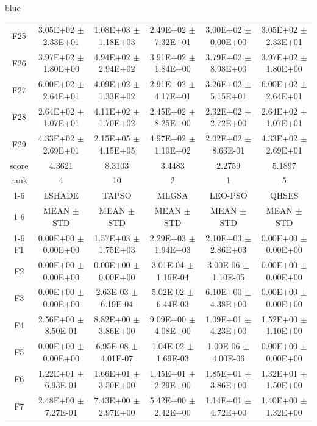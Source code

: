 \documentclass[journal, onecolumn]{IEEEtran}
\begin{document}
\begin{color}{blue}
\begin{table}[htbp!]
\begin{tabular}{c|ccccc}
			F25	 &	3.05E+02	$\pm$	2.33E+01	 &	1.08E+03	$\pm$	1.18E+03		 &	2.49E+02	$\pm$	7.32E+01		 &	3.00E+02	$\pm$	0.00E+00		 &	3.05E+02	$\pm$	2.33E+01	\\		
			F26	 &	3.97E+02	$\pm$	1.80E+00	 &	4.94E+02	$\pm$	2.94E+02		 &	3.91E+02	$\pm$	1.84E+00		 &	3.79E+02	$\pm$	8.98E+00		 &	3.97E+02	$\pm$	1.80E+00	\\		
			F27	 &	6.00E+02	$\pm$	2.64E+01	 &	4.09E+02	$\pm$	1.33E+02		 &	2.91E+02	$\pm$	4.17E+01		 &	3.26E+02	$\pm$	5.15E+01		 &	6.00E+02	$\pm$	2.64E+01	\\		
			F28	 &	2.64E+02	$\pm$	1.07E+01	 &	4.11E+02	$\pm$	1.70E+02		 &	2.45E+02	$\pm$	8.25E+00		 &	2.32E+02	$\pm$	2.72E+00		 &	2.64E+02	$\pm$	1.07E+01	\\		
			F29	 &	4.33E+02	$\pm$	2.69E+01	 &	2.15E+05	$\pm$	4.15E+05		 &	4.97E+02	$\pm$	1.10E+02		 &	2.02E+02	$\pm$	8.63E-01		 &	4.33E+02	$\pm$	2.69E+01	\\		\hline
			score		& 4.3621 & 8.3103 & 3.4483 & 2.2759 & 5.1897 											\\													
			rank	 	& 4 & 10 & 2 & 1 & 5 											\\	\cline{1-6}												
			&	LSHADE				 &	TAPSO				 &	MLGSA				 &	LEO-PSO				 &	QHSES			\\	\cline{1-6}
			&	MEAN	$\pm$	STD		 &	MEAN	$\pm$	STD		 &	MEAN	$\pm$	STD		 &	MEAN	$\pm$	STD		 &	MEAN	$\pm$	STD	\\	\cline{1-6}
			F1	 &	0.00E+00	$\pm$	0.00E+00		 &	1.57E+03	$\pm$	1.75E+03		 &	2.29E+03	$\pm$	1.94E+03		 &	2.10E+03	$\pm$	2.86E+03		 &	0.00E+00	$\pm$	0.00E+00	\\	
			F2	 &	0.00E+00	$\pm$	0.00E+00		 &	0.00E+00	$\pm$	0.00E+00		 &	3.01E-04	$\pm$	1.16E-04		 &	3.00E-06	$\pm$	1.10E-05		 &	0.00E+00	$\pm$	0.00E+00	\\	
			F3	 &	0.00E+00	$\pm$	0.00E+00		 &	2.63E-03	$\pm$	6.19E-04		 &	5.02E-02	$\pm$	6.44E-03		 &	6.10E+00	$\pm$	4.38E+00		 &	0.00E+00	$\pm$	0.00E+00	\\	
			F4	 &	2.56E+00	$\pm$	8.50E-01		 &	8.82E+00	$\pm$	3.86E+00		 &	9.09E+00	$\pm$	4.08E+00		 &	1.09E+01	$\pm$	4.23E+00		 &	1.52E+00	$\pm$	1.10E+00	\\	
			F5	 &	0.00E+00	$\pm$	0.00E+00		 &	6.95E-08	$\pm$	4.01E-07		 &	1.04E-02	$\pm$	1.69E-03		 &	1.00E-06	$\pm$	4.00E-06		 &	0.00E+00	$\pm$	0.00E+00	\\	
			F6	 &	1.22E+01	$\pm$	6.93E-01		 &	1.66E+01	$\pm$	3.50E+00		 &	1.45E+01	$\pm$	2.29E+00		 &	1.85E+01	$\pm$	3.86E+00		 &	1.32E+01	$\pm$	1.50E+00	\\	
			F7	 &	2.48E+00	$\pm$	7.27E-01		 &	7.43E+00	$\pm$	2.97E+00		 &	5.42E+00	$\pm$	2.42E+00		 &	1.14E+01	$\pm$	4.72E+00		 &	1.40E+00	$\pm$	1.32E+00	\\	

\end{tabular}
\end{table}
\end{color}
\end{document}
